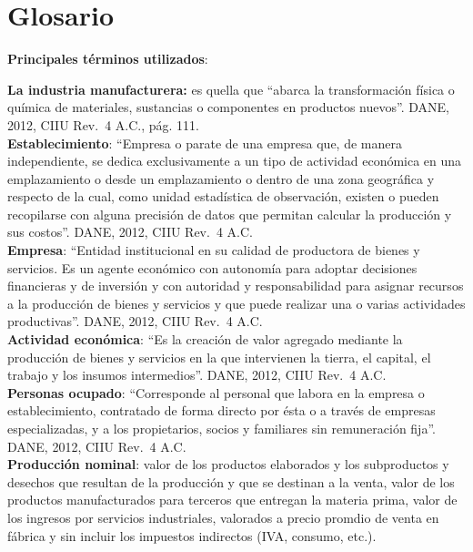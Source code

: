 \documentclass[
]{article}
\begin{document}
\hypertarget{glosario}{%
\section{Glosario}\label{glosario}}

\textbf{Principales términos utilizados}:

\textbf{La industria manufacturera:} es quella que ``abarca la
transformación física o química de materiales, sustancias o componentes
en productos nuevos''. DANE, 2012, CIIU Rev.~4 A.C., pág. 111.\\

\textbf{Establecimiento}: ``Empresa o parate de una empresa que, de
manera independiente, se dedica exclusivamente a un tipo de actividad
económica en una emplazamiento o desde un emplazamiento o dentro de una
zona geográfica y respecto de la cual, como unidad estadística de
observación, existen o pueden recopilarse con alguna precisión de datos
que permitan calcular la producción y sus costos''. DANE, 2012, CIIU
Rev.~4 A.C.\\

\textbf{Empresa}: ``Entidad institucional en su calidad de productora de
bienes y servicios. Es un agente económico con autonomía para adoptar
decisiones financieras y de inversión y con autoridad y responsabilidad
para asignar recursos a la producción de bienes y servicios y que puede
realizar una o varias actividades productivas''. DANE, 2012, CIIU Rev.~4
A.C.\\

\textbf{Actividad económica}: ``Es la creación de valor agregado
mediante la producción de bienes y servicios en la que intervienen la
tierra, el capital, el trabajo y los insumos intermedios''. DANE, 2012,
CIIU Rev.~4 A.C.\\

\textbf{Personas ocupado}: ``Corresponde al personal que labora en la
empresa o establecimiento, contratado de forma directo por ésta o a
través de empresas especializadas, y a los propietarios, socios y
familiares sin remuneración fija''. DANE, 2012, CIIU Rev.~4 A.C.\\

\textbf{Producción nominal}: valor de los productos elaborados y los
subproductos y desechos que resultan de la producción y que se destinan
a la venta, valor de los productos manufacturados para terceros que
entregan la materia prima, valor de los ingresos por servicios
industriales, valorados a precio promdio de venta en fábrica y sin
incluir los impuestos indirectos (IVA, consumo, etc.).\\
\end{document}
